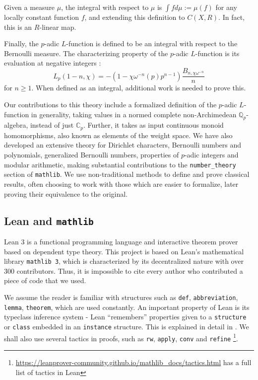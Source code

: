 \documentclass[a4paper,UKenglish,cleveref, autoref, thm-restate]{lipics-v2021}
\newcommand{\lean}[1]{\texttt{#1}\xspace} %
\begin{document}
Given a measure $\mu$, the integral with respect to $\mu$ is 
$\int f d\mu := \mu (f)$ for any locally constant function $f$, and 
extending this definition to $C(X, R)$. In fact, this is an $R$-linear map. 

Finally, the $p$-adic $L$-function is defined to be an integral with respect to the Bernoulli 
measure. The characterizing property of the $p$-adic $L$-function is its evaluation at negative integers : 
$$ L_p (1 - n, \chi) = -(1 - \chi \omega^{-n}(p)p^{n - 1}) \frac{B_{n, \chi \omega^{-n}}}{n} $$
for $n \ge 1$. When defined as an integral, additional work is needed to prove this. 

Our contributions to this theory include a formalized definition of the $p$-adic $L$-function in generality, 
taking values in a normed complete non-Archimedean $\mathbb{Q}_p$-algebra, instead of just $\mathbb{C}_p$. Further, it takes as 
input continuous monoid homomorphisms, also known as elements of the weight space. We have also developed an extensive theory for 
Dirichlet characters, Bernoulli numbers and polynomials, generalized Bernoulli numbers, properties of $p$-adic integers and modular arithmetic, 
making substantial contributions to the \lean{number\_theory} section of \lean{mathlib}. 
We use non-traditional methods to define and prove classical results, often choosing to work with those which are easier to formalize, 
later proving their equivalence to the original. 

\subsection{Lean and \lean{mathlib}}
Lean 3 is a functional programming language and interactive theorem prover based on
dependent type theory. This project is based on Lean’s 
mathematical library \lean{mathlib 3}, which is characterized by
its decentralized nature with over 300 contributors. Thus, it is impossible to cite every author who contributed a piece of code that we used.

We assume the reader is familiar with structures such as \lean{def}, \lean{abbreviation}, \lean{lemma}, \lean{theorem}, which are used constantly. 
An important property of Lean is its typeclass inference system - 
Lean ``remembers'' properties given to a \lean{structure} or \lean{class} embedded in an \lean{instance} structure. This is explained in detail in \cite{mathlib}. 
We shall also use several tactics in proofs, such as \lean{rw}, \lean{apply}, \lean{conv} and \lean{refine}
\footnote{\url{https://leanprover-community.github.io/mathlib_docs/tactics.html} has a full list of tactics in Lean}.
\end{document}
